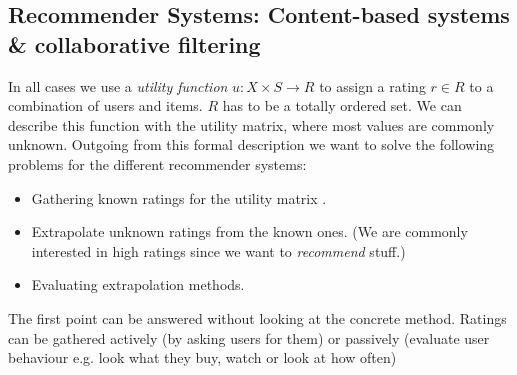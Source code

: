 \documentclass[]{article}
\begin{document}
\subsection{Recommender Systems: Content-based systems \& collaborative filtering}
In all cases we use a \emph{utility function} $u: X \times S \rightarrow R$ to assign a rating  $r \in R$ to a combination of users and items. $R$ has to be a totally ordered set. We can describe this function with the utility matrix, where most values are commonly unknown. Outgoing from this formal description we want to solve the following problems for the different recommender systems:
\begin{itemize}
\item Gathering known ratings for the utility matrix .
\item Extrapolate unknown ratings from the known ones. (We are commonly interested in high ratings since we want to \emph{recommend} stuff.)
\item Evaluating extrapolation methods.
\end{itemize}
The first point can be answered without looking at the concrete method. Ratings can be gathered actively (by asking users for them) or passively (evaluate user behaviour e.g. look what they buy, watch or look at how often) 
\end{document}
